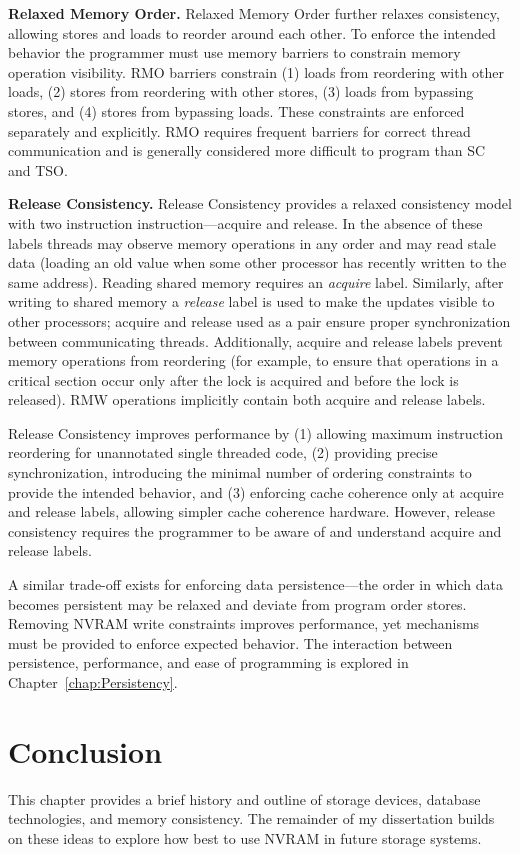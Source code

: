 \textbf{Relaxed Memory Order.}
Relaxed Memory Order \cite{SPARCv9} further relaxes consistency, allowing stores and loads to reorder around each other.
To enforce the intended behavior the programmer must use memory barriers to constrain memory operation visibility.
RMO barriers constrain (1) loads from reordering with other loads, (2) stores from reordering with other stores, (3) loads from bypassing stores, and (4) stores from bypassing loads.
These constraints are enforced separately and explicitly.
RMO requires frequent barriers for correct thread communication and is generally considered more difficult to program than SC and TSO.

\textbf{Release Consistency.}
Release Consistency \cite{GharachorlooLenoski90} provides a relaxed consistency model with two instruction instruction---acquire and release.
In the absence of these labels threads may observe memory operations in any order and may read stale data (loading an old value when some other processor has recently written to the same address).
Reading shared memory requires an \emph{acquire} label.
Similarly, after writing to shared memory a \emph{release} label is used to make the updates visible to other processors; acquire and release used as a pair ensure proper synchronization between communicating threads.
Additionally, acquire and release labels prevent memory operations from reordering (for example, to ensure that operations in a critical section occur only after the lock is acquired and before the lock is released).
RMW operations implicitly contain both acquire and release labels.

Release Consistency improves performance by (1) allowing maximum instruction reordering for unannotated single threaded code, (2) providing precise synchronization, introducing the minimal number of ordering constraints to provide the intended behavior, and (3) enforcing cache coherence only at acquire and release labels, allowing simpler cache coherence hardware.
However, release consistency requires the programmer to be aware of and understand acquire and release labels.

A similar trade-off exists for enforcing data persistence---the order in which data becomes persistent may be relaxed and deviate from program order stores.
Removing NVRAM write constraints improves performance, yet mechanisms must be provided to enforce expected behavior.
The interaction between persistence, performance, and ease of programming is explored in Chapter~\ref{chap:Persistency}.

\section{Conclusion}
\label{sec:Background:Conclusion}

This chapter provides a brief history and outline of storage devices, database technologies, and memory consistency.
The remainder of my dissertation builds on these ideas to explore how best to use NVRAM in future storage systems.
